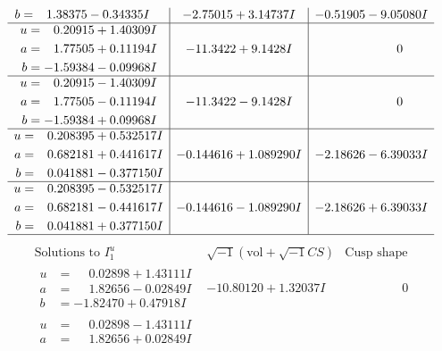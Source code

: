 \documentclass[1p]{elsarticle_modified}
\theoremstyle{definition}
\newcommand{\I}{\sqrt{-1}}
\begin{document}
$$\begin{array}{c|c|c}
\begin{aligned}
b &= \phantom{-}1.38375 - 0.34335 I\end{aligned}
 & -2.75015 + 3.14737 I & -0.51905 - 9.05080 I \\ \hline\begin{aligned}
u &= \phantom{-}0.20915 + 1.40309 I \\
a &= \phantom{-}1.77505 + 0.11194 I \\
b &= -1.59384 - 0.09968 I\end{aligned}
 & -11.3422 + 9.1428 I & \phantom{-0.000000 } 0 \\ \hline\begin{aligned}
u &= \phantom{-}0.20915 - 1.40309 I \\
a &= \phantom{-}1.77505 - 0.11194 I \\
b &= -1.59384 + 0.09968 I\end{aligned}
 & -11.3422 - 9.1428 I & \phantom{-0.000000 } 0 \\ \hline\begin{aligned}
u &= \phantom{-}0.208395 + 0.532517 I \\
a &= \phantom{-}0.682181 + 0.441617 I \\
b &= \phantom{-}0.041881 - 0.377150 I\end{aligned}
 & -0.144616 + 1.089290 I & -2.18626 - 6.39033 I \\ \hline\begin{aligned}
u &= \phantom{-}0.208395 - 0.532517 I \\
a &= \phantom{-}0.682181 - 0.441617 I \\
b &= \phantom{-}0.041881 + 0.377150 I\end{aligned}
 & -0.144616 - 1.089290 I & -2.18626 + 6.39033 I\\
 \hline 
 \end{array}$$\newpage$$\begin{array}{c|c|c}  
\text{Solutions to }I^u_{1}& \I (\text{vol} + \sqrt{-1}CS) & \text{Cusp shape}\\
 \hline 
\begin{aligned}
u &= \phantom{-}0.02898 + 1.43111 I \\
a &= \phantom{-}1.82656 - 0.02849 I \\
b &= -1.82470 + 0.47918 I\end{aligned}
 & -10.80120 + 1.32037 I & \phantom{-0.000000 } 0 \\ \hline\begin{aligned}
u &= \phantom{-}0.02898 - 1.43111 I \\
a &= \phantom{-}1.82656 + 0.02849 I \\

\end{aligned}
\end{array}$$
\end{document}
